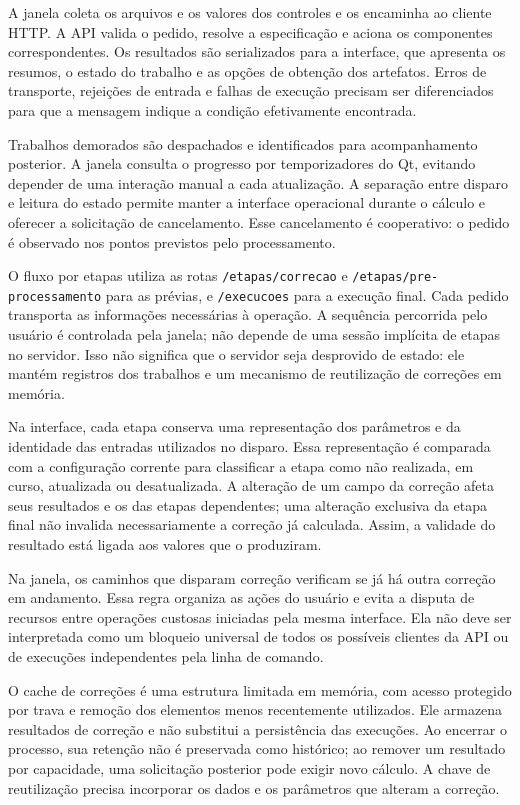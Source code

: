 A janela coleta os arquivos e os valores dos controles e os encaminha ao cliente HTTP. A API valida o pedido, resolve a especificação e aciona os componentes correspondentes. Os resultados são serializados para a interface, que apresenta os resumos, o estado do trabalho e as opções de obtenção dos artefatos. Erros de transporte, rejeições de entrada e falhas de execução precisam ser diferenciados para que a mensagem indique a condição efetivamente encontrada.

Trabalhos demorados são despachados e identificados para acompanhamento posterior. A janela consulta o progresso por temporizadores do Qt, evitando depender de uma interação manual a cada atualização. A separação entre disparo e leitura do estado permite manter a interface operacional durante o cálculo e oferecer a solicitação de cancelamento. Esse cancelamento é cooperativo: o pedido é observado nos pontos previstos pelo processamento.

{\sloppy O fluxo por etapas utiliza as rotas \texttt{/etapas/\allowbreak{}correcao} e \texttt{/etapas/\allowbreak{}pre-processamento} para as prévias, e \texttt{/execucoes} para a execução final. Cada pedido transporta as informações necessárias à operação. A sequência percorrida pelo usuário é controlada pela janela; não depende de uma sessão implícita de etapas no servidor. Isso não significa que o servidor seja desprovido de estado: ele mantém registros dos trabalhos e um mecanismo de reutilização de correções em memória.\par}

Na interface, cada etapa conserva uma representação dos parâmetros e da identidade das entradas utilizados no disparo. Essa representação é comparada com a configuração corrente para classificar a etapa como não realizada, em curso, atualizada ou desatualizada. A alteração de um campo da correção afeta seus resultados e os das etapas dependentes; uma alteração exclusiva da etapa final não invalida necessariamente a correção já calculada. Assim, a validade do resultado está ligada aos valores que o produziram.

Na janela, os caminhos que disparam correção verificam se já há outra correção em andamento. Essa regra organiza as ações do usuário e evita a disputa de recursos entre operações custosas iniciadas pela mesma interface. Ela não deve ser interpretada como um bloqueio universal de todos os possíveis clientes da API ou de execuções independentes pela linha de comando.

O cache de correções é uma estrutura limitada em memória, com acesso protegido por trava e remoção dos elementos menos recentemente utilizados. Ele armazena resultados de correção e não substitui a persistência das execuções. Ao encerrar o processo, sua retenção não é preservada como histórico; ao remover um resultado por capacidade, uma solicitação posterior pode exigir novo cálculo. A chave de reutilização precisa incorporar os dados e os parâmetros que alteram a correção.

